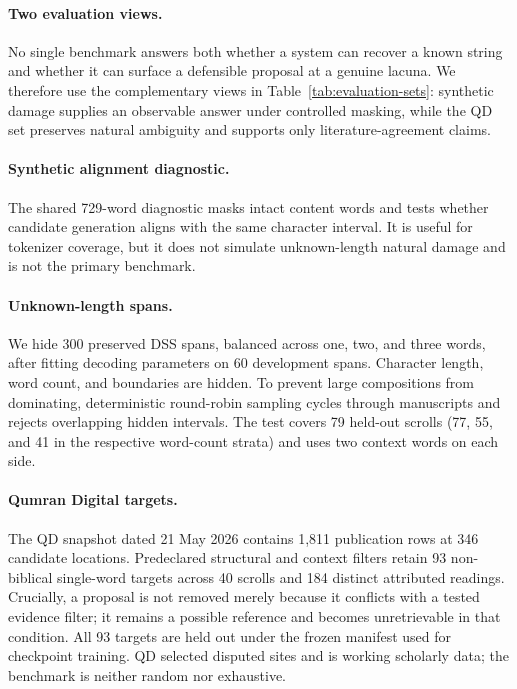 \documentclass[10pt,twocolumn,a4paper]{article}
\begin{document}
\paragraph{Two evaluation views.}
No single benchmark answers both whether a system can recover a known string and whether it can surface a defensible proposal at a genuine lacuna. We therefore use the complementary views in Table~\ref{tab:evaluation-sets}: synthetic damage supplies an observable answer under controlled masking, while the QD set preserves natural ambiguity and supports only literature-agreement claims.

\EvaluationSetsTable

\paragraph{Synthetic alignment diagnostic.}
The shared 729-word diagnostic masks intact content words and tests whether candidate generation aligns with the same character interval. It is useful for tokenizer coverage, but it does not simulate unknown-length natural damage and is not the primary benchmark.

\paragraph{Unknown-length spans.}
We hide 300 preserved DSS spans, balanced across one, two, and three words, after fitting decoding parameters on 60 development spans. Character length, word count, and boundaries are hidden. To prevent large compositions from dominating, deterministic round-robin sampling cycles through manuscripts and rejects overlapping hidden intervals. The test covers 79 held-out scrolls (77, 55, and 41 in the respective word-count strata) and uses two context words on each side.

\paragraph{Qumran Digital targets.}
The QD snapshot dated 21 May 2026 contains 1,811 publication rows at 346 candidate locations. Predeclared structural and context filters retain 93 non-biblical single-word targets across 40 scrolls and 184 distinct attributed readings. Crucially, a proposal is not removed merely because it conflicts with a tested evidence filter; it remains a possible reference and becomes unretrievable in that condition. All 93 targets are held out under the frozen manifest used for checkpoint training. QD selected disputed sites and is working scholarly data; the benchmark is neither random nor exhaustive.
\end{document}
